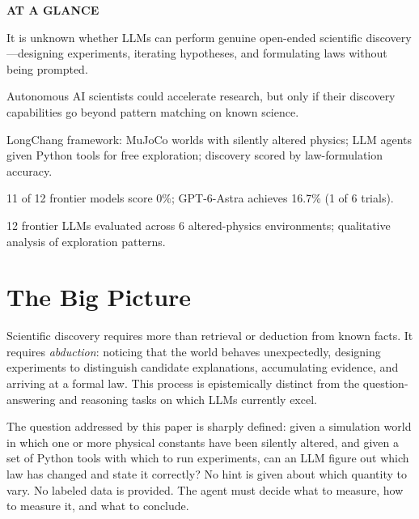 \documentclass[10pt,twocolumn]{article}
\begin{document}
\begin{mdframed}[backgroundcolor=boxgray,linecolor=rulered,linewidth=1pt,
    innerleftmargin=6pt,innerrightmargin=6pt,
    innertopmargin=6pt,innerbottommargin=6pt]
\textbf{\small AT A GLANCE}\par\vspace{4pt}
\begin{description}[leftmargin=0pt,labelsep=4pt,itemsep=2pt,parsep=0pt,
    font=\small\bfseries]
  \item[Problem:] It is unknown whether LLMs can perform genuine
    open-ended scientific discovery---designing experiments, iterating
    hypotheses, and formulating laws without being prompted.
  \item[Why it matters:] Autonomous AI scientists could accelerate
    research, but only if their discovery capabilities go beyond
    pattern matching on known science.
  \item[Method:] LongChang framework: MuJoCo worlds with silently
    altered physics; LLM agents given Python tools for free
    exploration; discovery scored by law-formulation accuracy.
  \item[Result:] 11 of 12 frontier models score 0\%; GPT-6-Astra
    achieves 16.7\% (1 of 6 trials).
  \item[Evidence:] 12 frontier LLMs evaluated across 6 altered-physics
    environments; qualitative analysis of exploration patterns.
\end{description}
\end{mdframed}

\section{The Big Picture}

Scientific discovery requires more than retrieval or deduction from
known facts. It requires \emph{abduction}: noticing that the world
behaves unexpectedly, designing experiments to distinguish candidate
explanations, accumulating evidence, and arriving at a formal law.
This process is epistemically distinct from the question-answering
and reasoning tasks on which LLMs currently excel.

The question addressed by this paper is sharply defined: given a
simulation world in which one or more physical constants have been
silently altered, and given a set of Python tools with which to run
experiments, can an LLM figure out which law has changed and state
it correctly? No hint is given about which quantity to vary. No
labeled data is provided. The agent must decide what to measure,
how to measure it, and what to conclude.
\end{document}
